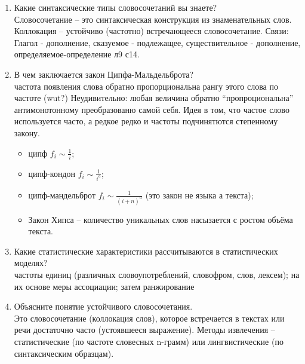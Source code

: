 \documentclass[a4paper]{article}
\begin{document}
\begin{enumerate}
	\item Какие синтаксические типы словосочетаний вы знаете?\hfill\\
	Словосочетание -- это синтаксическая конструкция из знаменательных слов. Коллокация -- устойчиво (частотно) встречающееся словосочетание. Связи: Глагол - дополнение, сказуемое - подлежащее, существительное - дополнение, определяемое-определение л9 с14.

	\item В чем заключается закон Ципфа-Мальдельброта?\hfill\\
	частота появления слова обратно пропорциональна рангу этого слова по частоте (wut?) Неудивительно: любая величина обратно ``пропроциональна'' антимонотонному преобразованю самой себя. Идея в том, что частое слово используется часто, а редкое редко и частоты подчинятются степенному закону. \begin{itemize}
		\item ципф $f_i\sim \frac{1}{i}$;
		\item ципф-кондон $f_i\sim \frac{1}{i^a}$;
		\item ципф-мандельброт $f_i\sim \frac{1}{(i+n)^a}$ (это закон не языка а текста);
		\item Закон Хипса -- количество уникальных слов насызается с ростом объёма текста.
	\end{itemize}

	\item Какие статистические характеристики рассчитываются в статистических моделях?\hfill\\
	частоты единиц (различных словоупотреблений, словофром, слов, лексем); на их основе меры ассоциации; затем ранжирование

	\item Объясните понятие устойчивого словосочетания.\hfill\\
	Это словосочетание (коллокация слов), которое встречается в текстах или речи достаточно часто (устоявшееся выражение). Методы извлечения -- статистические (по частоте словесных n-грамм) или лингвистические (по синтаксическим образцам).


\end{enumerate}
\end{document}
